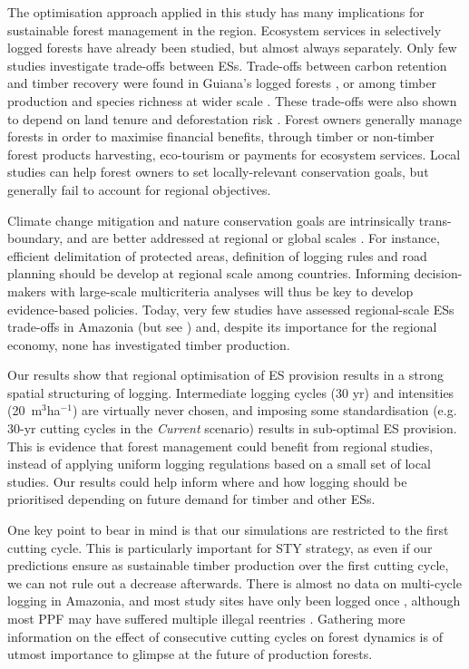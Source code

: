 \documentclass{article}
\begin{document}
The optimisation approach applied in this study has many implications for sustainable forest management in the region. Ecosystem services in selectively logged forests have already been studied, but almost always separately. Only few studies investigate trade-offs between ESs. Trade-offs between carbon retention and timber recovery were found in Guiana's logged forests \cite{Roopsind2018}, or among timber production and species richness at wider scale \cite{Burivalova2014}.  These trade-offs were also shown to depend on land tenure and deforestation risk \cite{Griscom2018}. 
Forest owners generally manage forests in order to maximise financial benefits, through timber or non-timber forest products harvesting, eco-tourism or payments for ecosystem services. Local studies can help forest owners to set locally-relevant conservation goals, but generally fail to account for regional objectives. 

Climate change mitigation and nature conservation goals are intrinsically trans-boundary, and are better addressed at regional or global scales \cite{Hein2006b}. For instance, efficient delimitation of protected areas, definition of logging rules and road planning should be develop at regional scale among countries. Informing decision-makers with large-scale multicriteria analyses will thus be key to develop evidence-based policies. Today, very few studies have assessed regional-scale ESs trade-offs in Amazonia (but see \cite{OConnell2018}) and, despite its importance for the regional economy, none has investigated timber production. 

Our results show that regional optimisation of ES provision results in a strong spatial structuring of logging. Intermediate logging cycles (30 yr) and intensities (20~m$^3$ha$^{-1}$) are virtually never chosen, and imposing some standardisation (e.g. 30-yr cutting cycles in the \textit{Current} scenario) results in sub-optimal ES provision. This is evidence that forest management could benefit from regional studies, instead of applying uniform logging regulations based on a small set of local studies. Our results could help inform where and how logging should be prioritised depending on future demand for timber and other ESs. 

One key point to bear in mind is that our simulations are restricted to the first cutting cycle. This is particularly important for STY strategy, as even if our predictions ensure as sustainable timber production over the first cutting cycle, we can not rule out a decrease afterwards. There is almost no data on multi-cycle logging in Amazonia, and most study sites have only been logged  once \cite{Sist2015}, although most PPF may have suffered multiple illegal reentries \cite{Tritsch2016a}. Gathering more information on the effect of consecutive cutting cycles on forest dynamics is of utmost importance to glimpse at the future of production forests. 
\end{document}
